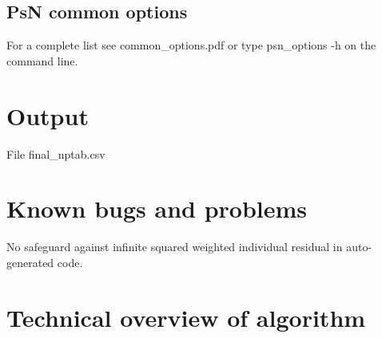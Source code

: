\subsection{PsN common options}
For a complete list see common\_options.pdf or type psn\_options -h on the command line.

\section{Output}
	
	File final\_nptab.csv
	
	\section{Known bugs and problems}
	
	No safeguard against infinite squared weighted individual residual in auto-generated code.
	
	\section{Technical overview of algorithm}
	
